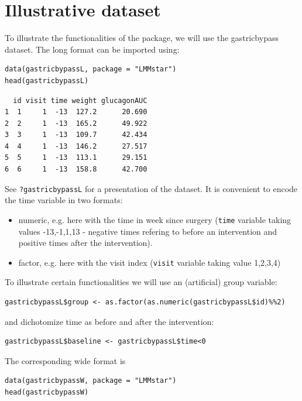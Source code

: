 \documentclass[12pt]{article}
\begin{document}
\clearpage

\section{Illustrative dataset}
\label{sec:orgf5267e2}

To illustrate the functionalities of the package, we will use the
gastricbypass dataset. The long format can be imported using:
\lstset{language=r,label= ,caption= ,captionpos=b,numbers=none}
\begin{lstlisting}
data(gastricbypassL, package = "LMMstar")
head(gastricbypassL)
\end{lstlisting}

\begin{verbatim}
  id visit time weight glucagonAUC
1  1     1  -13  127.2      20.690
2  2     1  -13  165.2      49.922
3  3     1  -13  109.7      42.434
4  4     1  -13  146.2      27.517
5  5     1  -13  113.1      29.151
6  6     1  -13  158.8      42.700
\end{verbatim}


See \texttt{?gastricbypassL} for a presentation of the dataset. It is
convenient to encode the time variable in two formats:
\begin{itemize}
\item numeric, e.g. here with the time in week since surgery (\texttt{time}
variable taking values -13,-1,1,13 - negative times refering to
before an intervention and positive times after the intervention).
\item factor, e.g. here with the visit index (\texttt{visit} variable taking
value 1,2,3,4)
\end{itemize}

To illustrate certain functionalities we will use an (artificial)
group variable:
\lstset{language=r,label= ,caption= ,captionpos=b,numbers=none}
\begin{lstlisting}
gastricbypassL$group <- as.factor(as.numeric(gastricbypassL$id)%%2)
\end{lstlisting}

and dichotomize time as before and after the intervention:
\lstset{language=r,label= ,caption= ,captionpos=b,numbers=none}
\begin{lstlisting}
gastricbypassL$baseline <- gastricbypassL$time<0
\end{lstlisting}

The corresponding wide format is
\lstset{language=r,label= ,caption= ,captionpos=b,numbers=none}
\begin{lstlisting}
data(gastricbypassW, package = "LMMstar")
head(gastricbypassW)
\end{lstlisting}
\end{document}
